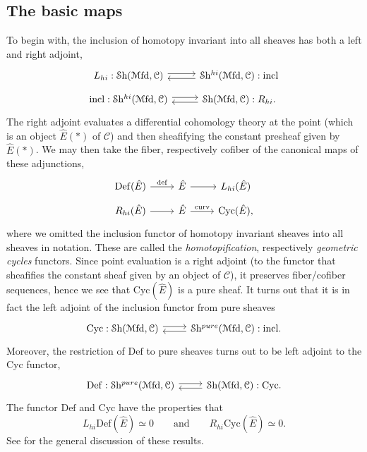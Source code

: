 \documentclass[a4paper]{book}
\newcommand{\lC}{\mathcal{C}}
\newcommand{\lM}{\mathcal{M}}
\newcommand{\lS}{\mathcal{S}}
\newcommand{\Shv}{\lS\mathrm{h}} %
\newcommand{\Mfd}{\lM\mathrm{fd}} %
\theoremstyle{definition}
\theoremstyle{remark}
\numberwithin{equation}{section}
\begin{document}
\subsection{The basic maps}
To begin with, the inclusion of homotopy invariant into all sheaves has both a left and right adjoint, 
\[
\begin{tikzcd}[row sep=0.2cm]
L_{hi} : \Shv(\Mfd, \lC)
\ar[r, shift left=1]
&
\Shv^{hi}(\Mfd, \lC)
\ar[l, shift left=1] : \mathrm{incl}
\\
\mathrm{incl} : \Shv^{hi}(\Mfd, \lC)
\ar[r, shift left=1]
&
\Shv(\Mfd, \lC)
\ar[l, shift left=1] : R_{hi}.
\end{tikzcd} 
\]
The right adjoint evaluates a differential cohomology theory at the point (which is an object $\hat{E}(*)$ of $\mathscr{C}$) and then sheafifying the constant presheaf given by $\hat{E}(*)$. We may then take the fiber, respectively cofiber of the canonical maps of these adjunctions,
\[
\begin{tikzcd}[row sep=0.2cm]
\mathrm{Def}(\hat{E}) \ar[r, "\mathrm{def}"] & \hat{E} \ar[r] & L_{hi}(\hat{E})
\\
R_{hi}(\hat{E}) \ar[r] & \hat{E} 
\ar[r, "\mathrm{curv}"] & \mathrm{Cyc}(\hat{E}),
\end{tikzcd}
\]
where we omitted the inclusion functor of homotopy invariant sheaves into all sheaves in notation. These are called the \emph{homotopification}, respectively \emph{geometric cycles} functors. Since point evaluation is a right adjoint (to the functor that sheafifies the constant sheaf given by an object of $\lC$), it preserves fiber/cofiber sequences, hence we see that $\mathrm{Cyc}(\hat{E})$ is a pure sheaf. It turns out that it is in fact the left adjoint of the inclusion functor from pure sheaves
\[
\begin{tikzcd}[row sep=0.2cm]
\mathrm{Cyc} : \Shv(\Mfd, \lC)
\ar[r, shift left=1]
&
\Shv^{pure}(\Mfd, \lC)
\ar[l, shift left=1] : \mathrm{incl}.
\end{tikzcd} 
\]
Moreover, the restriction of $\mathrm{Def}$ to pure sheaves turns out to be left adjoint to the $\mathrm{Cyc}$ functor, 
\[
\begin{tikzcd}
\mathrm{Def} : \Shv^{pure}(\Mfd, \lC)
\ar[r, shift left=1]
&
\Shv(\Mfd, \lC)
\ar[l, shift left=1] : \mathrm{Cyc}.
\end{tikzcd} 
\]
The functor $\mathrm{Def}$ and $\mathrm{Cyc}$ have the properties that
\[
L_{hi}\mathrm{Def}(\hat{E}) \simeq 0 \qquad \text{and} \qquad R_{hi}\mathrm{Cyc}(\hat{E}) \simeq 0.
\]
See \cite[\S3]{bunkenikolausvoelkl2016diffcoh} for the general discussion of these results.
\end{document}
